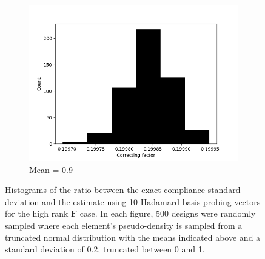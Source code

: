 \begin{figure}
\begin{subfigure}[t]{0.45\textwidth}
        \includegraphics[width=1\textwidth]{./images/robust_approx/results_2d_high_rank_figures/correcting_factors_hadamard_std_10_09.png}
        \caption{Mean = 0.9}
      \end{subfigure}
      \caption{Histograms of the ratio between the exact compliance standard deviation and the estimate using 10 Hadamard basis probing vectors for the high rank $\bm{F}$ case. In each figure, 500 designs were randomly sampled where each element's pseudo-density is sampled from a truncated normal distribution with the means indicated above and a standard deviation of 0.2, truncated between 0 and 1.}
      \label{fig:correcting_std_high_rank}
    \end{figure}

